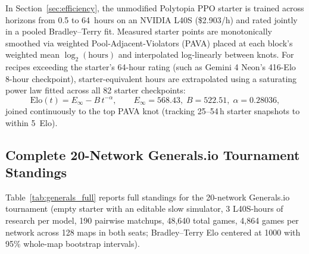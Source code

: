 \documentclass[11pt,letterpaper]{article}
\begin{document}
In Section~\ref{sec:efficiency}, the unmodified Polytopia PPO starter is trained across horizons from 0.5 to 64~hours on an NVIDIA L40S (\$2.903/h) and rated jointly in a pooled Bradley--Terry fit. Measured starter points are monotonically smoothed via weighted Pool-Adjacent-Violators (PAVA) placed at each block's weighted mean $\log_2(\text{hours})$ and interpolated log-linearly between knots. For recipes exceeding the starter's 64-hour rating (such as Gemini 4 Neon's 416-Elo 8-hour checkpoint), starter-equivalent hours are extrapolated using a saturating power law fitted across all 82 starter checkpoints:
\begin{equation}
  \text{Elo}(t) = E_\infty - B\, t^{-\alpha}, \qquad E_\infty = 568.43,\; B = 522.51,\; \alpha = 0.28036,
\end{equation}
joined continuously to the top PAVA knot (tracking 25--54\,h starter snapshots to within 5~Elo).

\subsection{Complete 20-Network Generals.io Tournament Standings}
\label{app:generals}

Table~\ref{tab:generals_full} reports full standings for the 20-network Generals.io tournament (empty starter with an editable slow simulator, 3 L40S-hours of research per model, 190 pairwise matchups, 48,640 total games, 4,864 games per network across 128 maps in both seats; Bradley--Terry Elo centered at 1000 with 95\% whole-map bootstrap intervals).
\end{document}
